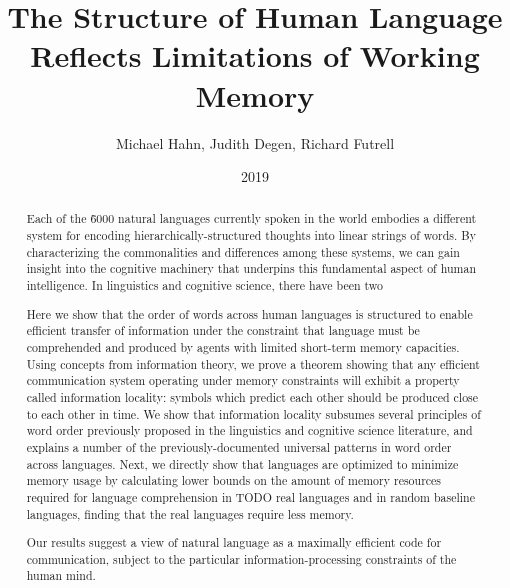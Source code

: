 \documentclass[11pt,letterpaper]{article}
\title{The Structure of Human Language Reflects Limitations of Working Memory}
\author{Michael Hahn, Judith Degen, Richard Futrell}
\date{2019}
\newcounter{theorem}
\begin{document}
\maketitle

\begin{abstract}
  Each of the \~6000 natural languages currently spoken in the world embodies a different system for encoding hierarchically-structured thoughts into linear strings of words.
  By characterizing the commonalities and differences among these systems, we can gain insight into the cognitive machinery that underpins this fundamental aspect of human intelligence. 
  In linguistics and cognitive science, there have been two 

  Here we show that the order of words across human languages is structured to enable efficient transfer of information under the constraint that language must be comprehended and produced by agents with limited short-term memory capacities.
  Using concepts from information theory, we prove a theorem showing that any efficient communication system operating under memory constraints will exhibit a property called information locality: symbols which predict each other should be produced close to each other in time.
  We show that information locality subsumes several principles of word order previously proposed in the linguistics and cognitive science literature, and explains a number of the previously-documented universal patterns in word order across languages.    
  Next, we directly show that languages are optimized to minimize memory usage by calculating lower bounds on the amount of memory resources required for language comprehension in TODO real languages and in random baseline languages, finding that the real languages require less memory.
  
  Our results suggest a view of natural language as a maximally efficient code for communication, subject to the particular information-processing constraints of the human mind. 
\end{abstract}



\end{document}
